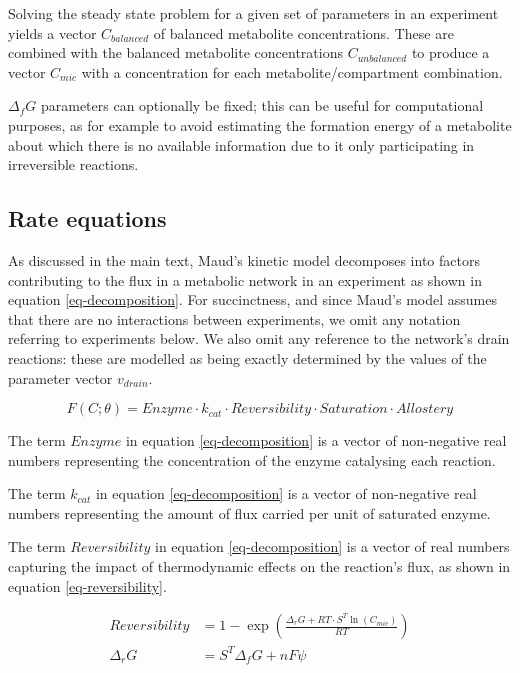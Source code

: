 \documentclass[journal=asbcd6,manuscript=article,layout=traditional]{achemso}
\begin{document}
Solving the steady state problem for a given set of parameters in an
experiment yields a vector \(C_{balanced}\) of balanced metabolite
concentrations. These are combined with the balanced metabolite
concentrations \(C_{unbalanced}\) to produce a vector \(C_{mic}\) with a
concentration for each metabolite/compartment combination.

\(\Delta_fG\) parameters can optionally be fixed; this can be useful for
computational purposes, as for example to avoid estimating the formation
energy of a metabolite about which there is no available information due
to it only participating in irreversible reactions.

\hypertarget{rate-equations}{%
\subsection{Rate equations}\label{rate-equations}}

As discussed in the main text, Maud's kinetic model decomposes into
factors contributing to the flux in a metabolic network in an experiment
as shown in equation \eqref{eq-decomposition}. For succinctness, and
since Maud's model assumes that there are no interactions between
experiments, we omit any notation referring to experiments below. We
also omit any reference to the network's drain reactions: these are
modelled as being exactly determined by the values of the parameter
vector \(v_{drain}\).

\begin{equation}
F(C;\theta) = Enzyme\cdot k_{cat}\cdot Reversibility \cdot Saturation \cdot Allostery \label{eq-decomposition}
\end{equation}

The term \(Enzyme\) in equation \eqref{eq-decomposition} is a vector of
non-negative real numbers representing the concentration of the enzyme
catalysing each reaction.

The term \(k_{cat}\) in equation \eqref{eq-decomposition} is a vector of
non-negative real numbers representing the amount of flux carried per
unit of saturated enzyme.

The term \(Reversibility\) in equation \eqref{eq-decomposition} is a
vector of real numbers capturing the impact of thermodynamic effects on
the reaction's flux, as shown in equation \eqref{eq-reversibility}.

\begin{align} 
  Reversibility &= 1 - \exp(\frac{\Delta_{r}G + RT \cdot S^T \ln(C_{mic})}{RT}) \label{eq-reversibility} \\ 
  \Delta_{r}G &= S^{T}\Delta_{f}G + n F \psi \nonumber 
\end{align}
\end{document}
